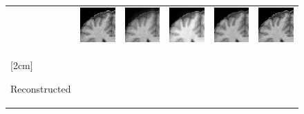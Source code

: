 \documentclass[review]{elsarticle}
\begin{document}
\begin{figure}
\begin{raggedright}
\begin{tabular}{>{\centering}b{0.2cm}lcccc}
{\begin{turn}{90}
							\end{turn}} & \includegraphics[width=2.5cm]{include/grp1/res7_org_zoom} & \includegraphics[width=2.5cm]{include/grp1/res7_zero_zoom} & \includegraphics[width=2.5cm]{include/grp1/res7_cs_zoom} & \includegraphics[width=2.5cm]{include/grp1/res7_L2_zoom} & \includegraphics[width=2.5cm]{include/grp1/res7_our_zoom}\tabularnewline
							\multirow{1}{0.2cm}[2cm]{\begin{turn}{90}
									{\footnotesize{}Reconstructed}

\end{turn}}
\end{tabular}
\end{raggedright}
\end{figure}
\end{document}
